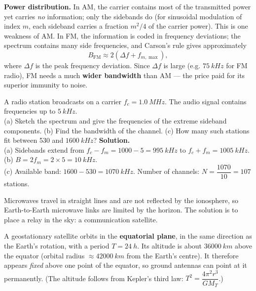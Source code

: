 \documentclass[11pt]{article}
\newcommand{\cle}[1]{{\popxbold\color{popdark}#1}}
\newcounter{popsec}
\newcounter{popsub}
\newcommand{\courssub}[1]{%
  \stepcounter{popsub}%
  \par\vspace{9pt}\noindent{\popxbold\fontsize{11.5}{13}\selectfont\color{popink}{\color{poporange}\thepopsec.\thepopsub}\hspace{6pt}#1}\par\nopagebreak\vspace{4pt}
}
\begin{document}
\textbf{Power distribution.} In AM, the carrier contains most of the transmitted power yet carries \emph{no} information; only the sidebands do (for sinusoidal modulation of index $m$, each sideband carries a fraction $m^2/4$ of the carrier power). This is one weakness of AM. In \cle{FM}, the information is coded in frequency deviations; the spectrum contains many side frequencies, and Carson's rule gives approximately
\[ B_{\text{FM}} \approx 2(\Delta f + f_{m,\max}), \]
where $\Delta f$ is the peak frequency deviation. Since $\Delta f$ is large (e.g. $\SI{75}{kHz}$ for FM radio), FM needs a much \textbf{wider bandwidth} than AM --- the price paid for its superior immunity to noise.

\begin{exoresolu}
A radio station broadcasts on a carrier $f_c = \SI{1.0}{MHz}$. The audio signal contains frequencies up to $\SI{5}{kHz}$.\\
(a) Sketch the spectrum and give the frequencies of the extreme sideband components. (b) Find the bandwidth of the channel. (c) How many such stations fit between 530 and $\SI{1600}{kHz}$?
\tcblower
\textbf{Solution.}\\
(a) Sidebands extend from $f_c - f_m = 1000 - 5 = \SI{995}{kHz}$ to $f_c + f_m = \SI{1005}{kHz}$.\\
(b) $B = 2 f_m = 2 \times 5 = \SI{10}{kHz}$.\\
(c) Available band: $1600 - 530 = \SI{1070}{kHz}$. Number of channels: $N = \dfrac{1070}{10} = 107$ stations.
\end{exoresolu}

\courssub{Satellite Communication}

Microwaves travel in straight lines and are not reflected by the ionosphere, so Earth-to-Earth microwave links are limited by the horizon. The solution is to place a relay in the sky: a \cle{communication satellite}.

\begin{propriete}
A \cle{geostationary satellite} orbits in the \textbf{equatorial plane}, in the same direction as the Earth's rotation, with a period $T = \SI{24}{h}$. Its altitude is about $\SI{36000}{km}$ above the equator (orbital radius $\approx \SI{42000}{km}$ from the Earth's centre). It therefore appears \emph{fixed} above one point of the equator, so ground antennas can point at it permanently. (The altitude follows from Kepler's third law: $T^2 = \dfrac{4\pi^2 r^3}{GM_T}$.)
\end{propriete}
\end{document}
